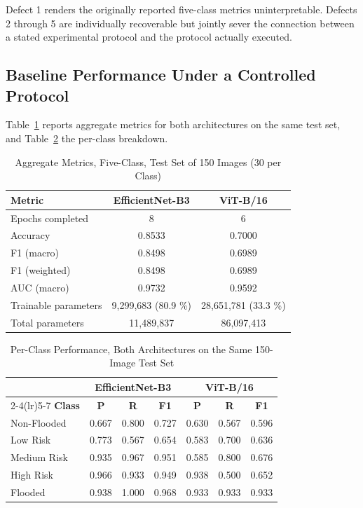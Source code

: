 Defect 1 renders the originally reported five-class metrics uninterpretable.
Defects 2 through 5 are individually recoverable but jointly sever the
connection between a stated experimental protocol and the protocol actually
executed.

\subsection{Baseline Performance Under a Controlled Protocol}
\label{sec:results-perf}

Table~\ref{tab:aggregate} reports aggregate metrics for both architectures on
the same test set, and Table~\ref{tab:perclass} the per-class breakdown.

\begin{table}[!t]
\caption{Aggregate Metrics, Five-Class, Test Set of 150 Images (30 per Class)}
\label{tab:aggregate}
\centering
\begin{tabular}{@{}lcc@{}}
\toprule
\textbf{Metric} & \textbf{EfficientNet-B3} & \textbf{ViT-B/16} \\
\midrule
Epochs completed    & 8    & 6    \\
Accuracy            & 0.8533 & 0.7000 \\
F1 (macro)          & 0.8498 & 0.6989 \\
F1 (weighted)       & 0.8498 & 0.6989 \\
AUC (macro)         & 0.9732 & 0.9592 \\
Trainable parameters & 9,299,683 (80.9 \%) & 28,651,781 (33.3 \%) \\
Total parameters    & 11,489,837 & 86,097,413 \\
\bottomrule
\end{tabular}
\end{table}

\begin{table}[!t]
\caption{Per-Class Performance, Both Architectures on the Same 150-Image Test Set}
\label{tab:perclass}
\centering
\begin{tabular}{@{}lcccccc@{}}
\toprule
 & \multicolumn{3}{c}{\textbf{EfficientNet-B3}} & \multicolumn{3}{c}{\textbf{ViT-B/16}} \\
\cmidrule(lr){2-4}\cmidrule(lr){5-7}
\textbf{Class} & \textbf{P} & \textbf{R} & \textbf{F1} & \textbf{P} & \textbf{R} & \textbf{F1} \\
\midrule
Non-Flooded  & 0.667 & 0.800 & 0.727 & 0.630 & 0.567 & 0.596 \\
Low Risk     & 0.773 & 0.567 & 0.654 & 0.583 & 0.700 & 0.636 \\
Medium Risk  & 0.935 & 0.967 & 0.951 & 0.585 & 0.800 & 0.676 \\
High Risk    & 0.966 & 0.933 & 0.949 & 0.938 & 0.500 & 0.652 \\
Flooded      & 0.938 & 1.000 & 0.968 & 0.933 & 0.933 & 0.933 \\
\bottomrule
\end{tabular}
\end{table}

